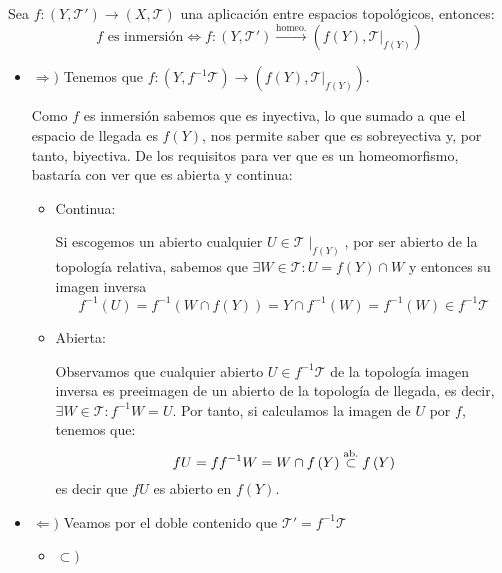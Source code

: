 \begin{prop}
Sea $f: \left( Y, \mathcal{T}' \right) \rightarrow \left( X, \mathcal{T} \right)$ una aplicación entre espacios topológicos, entonces:
\[
    f\text{ es inmersión} \Leftrightarrow f: \left( Y, \mathcal{T}' \right) \xrightarrow{\text{homeo.}} \left( f\left( Y \right), \mathcal{T}|_{f\left( Y \right)} \right)
\]
\end{prop}
\begin{demo}
\begin{itemize}
    \item $\Rightarrow)$ Tenemos que $f: \left( Y, f^{-1}\mathcal{T} \right) \rightarrow \left( f\left( Y \right), \mathcal{T}|_{f\left( Y \right)} \right)$. 

    Como $f$ es inmersión sabemos que es inyectiva, lo que sumado a que el espacio de llegada es $f(Y)$, nos permite saber que es sobreyectiva y, por tanto, biyectiva. De los requisitos para ver que es un homeomorfismo, bastaría con ver que es abierta y continua:
    \begin{itemize}
        \item Continua:
        
        Si escogemos un abierto cualquier $U\in \mathcal{T}\mid_{f(Y)}$, por ser abierto de la topología relativa, sabemos que $\exists W \in \mathcal{T}: U = f\left( Y \right) \cap W $ y entonces su imagen inversa
        \[
        f^{-1}\left( U \right) = f^{-1}\left( W \cap f\left( Y \right) \right) = Y \cap f^{-1}\left( W \right) = f^{-1}\left( W \right) \in f^{-1}\mathcal{T}
        \]

        \item Abierta:
        
        Observamos que cualquier abierto $U \in f^{-1}\mathcal{T}$ de la topología imagen inversa es preeimagen de un abierto de la topología de llegada, es decir, $\exists W \in \mathcal{T}: f^{-1}W = U$. Por tanto, si calculamos la imagen de $U$ por $f$, tenemos que:
        \[
        fU = ff^{-1}W = W \cap f\left( Y \right) \stackrel{\text{ab.}}{\subset} f\left( Y \right)
        \]
        es decir que $fU$ es abierto en $f\left( Y \right)$.
    \end{itemize}

    \item $\Leftarrow)$ Veamos por el doble contenido que $\mathcal{T}' = f^{-1}\mathcal{T}$
    \begin{itemize}
        \item $\subset)$
        

\end{itemize}
\end{itemize}
\end{demo}
